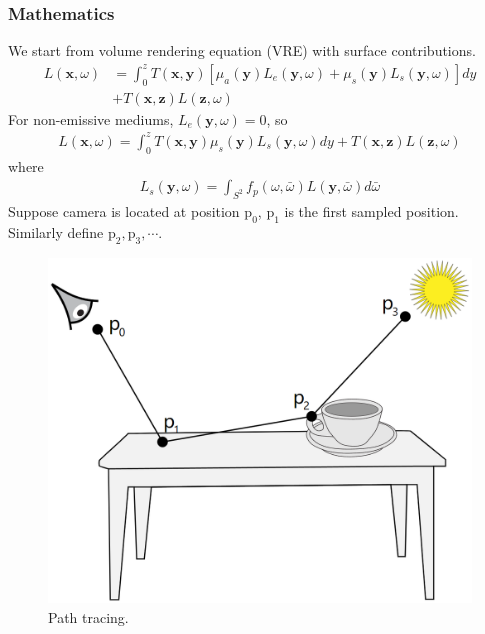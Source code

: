 \documentclass[acmtog]{acmart}
\def\x{\mathrm{\mathbf{x}}}
\def\y{\mathrm{\mathbf{y}}}
\def\z{\mathrm{\mathbf{z}}}
\def\w{\omega}
\def\p{\mathrm{p}}
\begin{document}
\subsubsection{Mathematics}
        We start from volume rendering equation (VRE) with surface contributions.
\begin{equation} \label{eq1}
\begin{split}
    L(\x,\w) &= \int_0^z T(\x,\y)[\mu_a(\y)L_e(\y,\w)+\mu_s(\y)L_s(\y,\w)]dy\\
             &+T(\x,\z)L(\z,\w)
\end{split}
\end{equation}
    For non-emissive mediums, $L_e(\y,\w)=0$, so
\begin{equation} \label{eq2}
\begin{split}
    L(\x,\w) = \int_0^z T(\x,\y)\mu_s(\y)L_s(\y,\w)dy+T(\x,\z)L(\z,\w)
\end{split}
\end{equation}
    where
\begin{equation} \label{eq3}
\begin{split}
    L_s(\y,\w) = \int_{S^2}f_p(\w,\bar{\w})L(\y,\bar{\w})d\bar{\w}
\end{split}
\end{equation}
    Suppose camera is located at position $\p_0$, $\p_1$ is the first sampled position.
    Similarly define $\p_2, \p_3, \cdots$.
\begin{figure}[H]
    \includegraphics[scale=0.1]{pictures/path tracing.png}
    \centering
    \caption{Path tracing.}
\end{figure}
\end{document}
